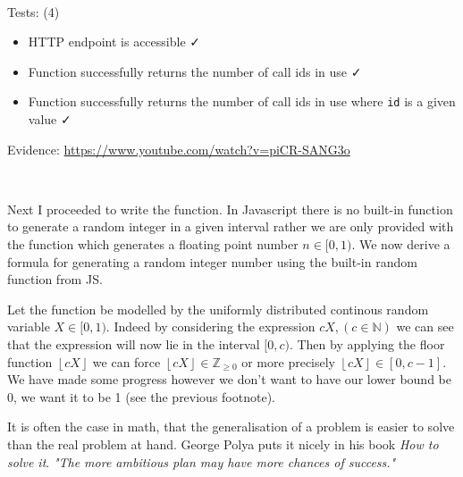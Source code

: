 {\color{gray} \hrulefill} \\ \vspace{0.2cm}

{\sffamily Tests: (4)}

\begin{itemize}
  \item HTTP endpoint is accessible \faCheck \\
  \item Function successfully returns the number of call ids in use \faCheck \\
  \item Function successfully returns the number of call ids in use where \texttt{id} is a given value \faCheck \\
\end{itemize}

{\sffamily Evidence:} \url{https://www.youtube.com/watch?v=piCR-SANG3o}\\ \vspace{0.2cm}

{\color{gray} \hrulefill} \\ \vspace{0.2cm}

Next I proceeded to write the 
function. In Javascript there is no built-in function to
generate a random integer in a given interval rather we
are only provided with the  function
which generates a floating point number $n \in [0, 1)$.
We now derive a formula for generating a random integer
number using the built-in random function from JS. \\ \vspace{0.2cm}

Let the  function be modelled by
the uniformly distributed continous random variable
$X \in [0, 1)$. Indeed by considering the expression
$cX, (c \in \mathbb{N})$ we can see that the
expression will now lie in the interval $[0, c)$. Then by
applying the floor function
$\left \lfloor {cX} \right \rfloor$ we can force
$\left \lfloor {cX} \right \rfloor \in \mathbb{Z}_{\geq 0}$
or more precisely
$\left \lfloor {cX} \right \rfloor \in [0, c-1]$. We have
made some progress however we don't want to have our lower
bound be 0, we want it to be 1 (see the previous footnote).\\
\vspace{0.2cm}

It is often the case in math, that the generalisation of a
problem is easier to solve than the real problem at hand.
George Polya puts it nicely in his book \textit{How to solve
it}. \textit{"The more ambitious plan may have more chances
of success."} \\ \vspace{0.2cm}

